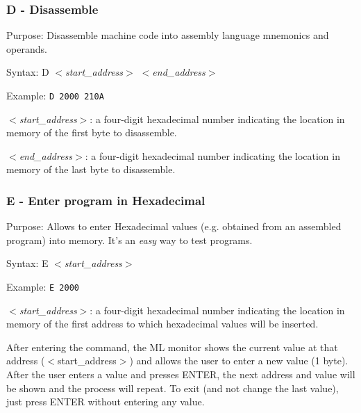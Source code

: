         \subsubsection{D - Disassemble}

        Purpose: Disassemble machine code into assembly language mnemonics and
        operands.

        Syntax: D \textit{$<$start\_address$>$ $<$end\_address$>$}

        Example: \texttt{D 2000 210A}

        \hspace{1cm}\textit{$<$start\_address$>$}: a four-digit hexadecimal
        number indicating the location in memory of the first byte to
        disassemble.

        \hspace{1cm}\textit{$<$end\_address$>$}: a four-digit hexadecimal
        number indicating the location in memory of the last byte to
        disassemble.

        \subsubsection{E - Enter program in Hexadecimal}

        Purpose:  Allows to enter Hexadecimal values (e.g. obtained from an
        assembled program) into memory. It's an \textit{easy} way to test
        programs.

        Syntax: E \textit{$<$start\_address$>$}

        Example: \texttt{E 2000}

        \hspace{1cm}\textit{$<$start\_address$>$}: a four-digit hexadecimal
        number indicating the location in memory of the first address to which
        hexadecimal values will be inserted.

        After entering the command, the ML monitor shows the current value at
        that address ($<$start\_address$>$) and allows the user to enter a new
        value (1 byte). After the user enters a value and presses ENTER, the
        next address and value will be shown and the process will repeat.
        To exit (and not change the last value), just press ENTER without
        entering any value.

